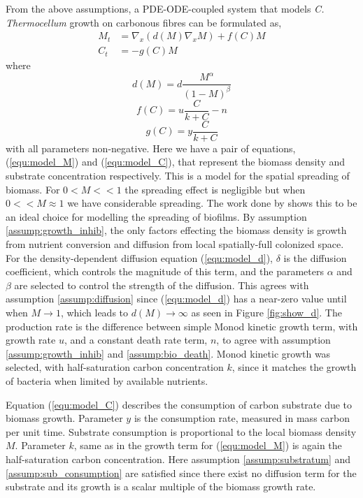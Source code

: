 From the above assumptions, a PDE-ODE-coupled system that models \textit{C. Thermocellum} growth on carbonous fibres can be formulated as,
\begin{align} 
   M_t &= \nabla_x \left( d(M) \nabla_x M \right) + f(C) M \label{equ:model_M}\\
   C_t &= -g(C) M \label{equ:model_C}
\end{align}
where
\begin{equation} \label{equ:model_d}
  d(M) = d \frac{M^\alpha}{(1-M)^\beta}
\end{equation}
\begin{equation} \label{equ:model_f}
  f(C) = u \frac{C}{k + C} - n 
\end{equation}
\begin{equation} \label{equ:model_g}
  g(C) = y \frac{C}{k + C}
\end{equation}
with all parameters non-negative.
Here we have a pair of equations, (\ref{equ:model_M}) and (\ref{equ:model_C}), that represent the biomass density and substrate concentration respectively.
This is a model for the spatial spreading of biomass.
For $0 < M << 1$ the spreading effect is negligible but when $0 << M \approx 1$ we have considerable spreading.
The work done by \cite{khassehkhan2009nonlinearMaster} shows this to be an ideal choice for modelling the spreading of biofilms.
By assumption \ref{assump:growth_inhib}, the only factors effecting the biomass density is growth from nutrient conversion and diffusion from local spatially-full colonized space.
For the density-dependent diffusion equation (\ref{equ:model_d}), $\delta$ is the diffusion coefficient, which controls the magnitude of this term, and the parameters $\alpha$ and $\beta$ are selected to control the strength of the diffusion.
This agrees with assumption \ref{assump:diffusion} since (\ref{equ:model_d}) has a near-zero value until when $M \to 1$, which leads to $d(M) \to \infty$ as seen in Figure \ref{fig:show_d}. 
The production rate is the difference between simple Monod kinetic growth term, with growth rate $u$, and a constant death rate term, $n$, to agree with assumption \ref{assump:growth_inhib} and \ref{assump:bio_death}.
Monod kinetic growth was selected, with half-saturation carbon concentration $k$, since it matches the growth of bacteria when limited by available nutrients. %

Equation (\ref{equ:model_C}) describes the consumption of carbon substrate due to biomass growth.
Parameter $y$ is the consumption rate, measured in mass carbon per unit time.
Substrate consumption is proportional to the local biomass density $M$. 
Parameter $k$, same as in the growth term for (\ref{equ:model_M}) is again the half-saturation carbon concentration.
Here assumption \ref{assump:substratum} and \ref{assump:sub_consumption} are satisfied since there exist no diffusion term for the substrate and its growth is a scalar multiple of the biomass growth rate.


